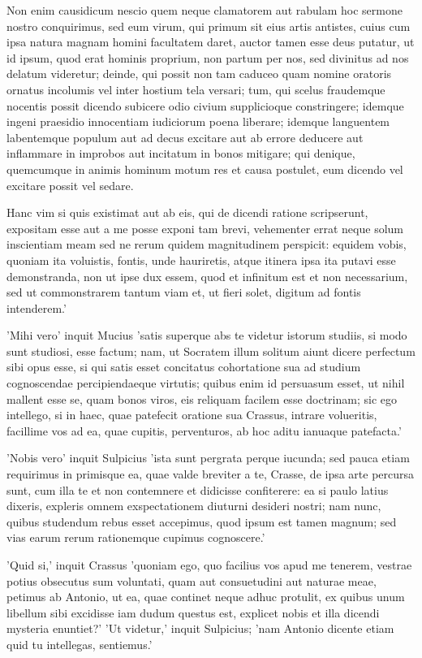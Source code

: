  Non enim causidicum nescio quem neque clamatorem aut rabulam hoc sermone nostro conquirimus, sed eum virum, qui primum sit eius artis antistes, cuius cum ipsa natura magnam homini facultatem daret, auctor tamen esse deus putatur, ut id ipsum, quod erat hominis proprium, non partum per nos, sed divinitus ad nos delatum videretur; deinde, qui possit non tam caduceo quam nomine oratoris ornatus incolumis vel inter hostium tela versari; tum, qui scelus fraudemque nocentis possit dicendo subicere odio civium supplicioque constringere; idemque ingeni praesidio innocentiam iudiciorum poena liberare; idemque languentem labentemque populum aut ad decus excitare aut ab errore deducere aut inflammare in improbos aut incitatum in bonos mitigare; qui denique, quemcumque in animis hominum motum res et causa postulet, eum dicendo vel excitare possit vel sedare.

 Hanc vim si quis existimat aut ab eis, qui de dicendi ratione scripserunt, expositam esse aut a me posse exponi tam brevi, vehementer errat neque solum inscientiam meam sed ne rerum quidem magnitudinem perspicit: equidem vobis, quoniam ita voluistis, fontis, unde hauriretis, atque itinera ipsa ita putavi esse demonstranda, non ut ipse dux essem, quod et infinitum est et non necessarium, sed ut commonstrarem tantum viam et, ut fieri solet, digitum ad fontis intenderem.'

 'Mihi vero' inquit Mucius 'satis superque abs te videtur istorum studiis, si modo sunt studiosi, esse factum; nam, ut Socratem illum solitum aiunt dicere perfectum sibi opus esse, si qui satis esset concitatus cohortatione sua ad studium cognoscendae percipiendaeque virtutis; quibus enim id persuasum esset, ut nihil mallent esse se, quam bonos viros, eis reliquam facilem esse doctrinam; sic ego intellego, si in haec, quae patefecit oratione sua Crassus, intrare volueritis, facillime vos ad ea, quae cupitis, perventuros, ab hoc aditu ianuaque patefacta.'

 'Nobis vero' inquit Sulpicius 'ista sunt pergrata perque iucunda; sed pauca etiam requirimus in primisque ea, quae valde breviter a te, Crasse, de ipsa arte percursa sunt, cum illa te et non contemnere et didicisse confiterere: ea si paulo latius dixeris, expleris omnem exspectationem diuturni desideri nostri; nam nunc, quibus studendum rebus esset accepimus, quod ipsum est tamen magnum; sed vias earum rerum rationemque cupimus cognoscere.'

 'Quid si,' inquit Crassus 'quoniam ego, quo facilius vos apud me tenerem, vestrae potius obsecutus sum voluntati, quam aut consuetudini aut naturae meae, petimus ab Antonio, ut ea, quae continet neque adhuc protulit, ex quibus unum libellum sibi excidisse iam dudum questus est, explicet nobis et illa dicendi mysteria enuntiet?' 'Ut videtur,' inquit Sulpicius; 'nam Antonio dicente etiam quid tu intellegas, sentiemus.'

